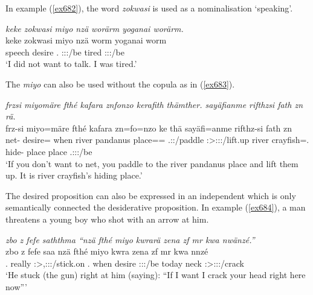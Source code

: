 In example (\ref{ex682}), the word \emph{zokwasi} is used as a nominalisation `speaking'.

\begin{exe}
	\ex \emph{keke zokwasi miyo nzä worärm yoganai worärm.}\\
	\gll keke zokwasi miyo nzä worm yoganai worm\\
	\Neg{} speech desire \Fsg.\Abs{} \Fsg:\Sbj:\Rpst:\Dur/be tired \Fsg:\Sbj:\Rpst:\Dur/be\\
	\trans `I did not want to talk. I was tired.'
	\label{ex682}
\end{exe}

The  \emph{miyo} can also be used without the copula as in (\ref{ex683}).

\begin{exe}
	\ex \emph{frzsi miyomäre fthé kafara znfonzo kerafith thämther. sayäfianme rifthzsi fath zn rä.}\\
	\gll frz-si miyo=märe fthé kafara zn=fo=nzo ke thä sayäfi=anme rifthz-si fath zn \\
	net-\Nmlz{} desire=\Priv{} when {river pandanus} place=\All=\Only{} \Ssg.\Sbj:\Imp:\Pfv/paddle \Ssg:\Sbj>\Stpl:\Obj:\Imp:\Pfv/lift.up {river crayfish}=\Poss.\Nsg{} hide-\Nmlz{} place place \Tsg.\F:\Sbj:\Nonpast:\Ipfv/be\\
	\trans `If you don't want to net, you paddle to the river pandanus place and lift them up. It is river crayfish's hiding place.'
	\label{ex683}
\end{exe}

The desired proposition can also be expressed in an independent  which is only semantically connected the desiderative proposition. In example (\ref{ex684}), a man threatens a young boy who shot with an arrow at him.

\begin{exe}
	\ex \emph{zbo z fefe saththma ``nzä fthé miyo kwrarä zena zf mr kwa nwänzé.''}\\
	\gll zbo z fefe saa nzä fthé miyo kwra zena zf mr kwa nnzé\\
	\Prox.\All{} \Imm{} really \Stsg:\Sbj>\Tsg,\Masc:\Io:\Pst:\Pfv/stick.on \Fsg.\Abs{} when desire \Fsg:\Sbj:\Irr:\Ipfv/be today \Imm{} neck \Fut{} \Fsg:\Sbj>\Ssg:\Obj:\Nonpast:\Ipfv/crack\\
	\trans `He stuck (the gun) right at him (saying): ``If I want I crack your head right here now'''
	\label{ex684}
\end{exe}

